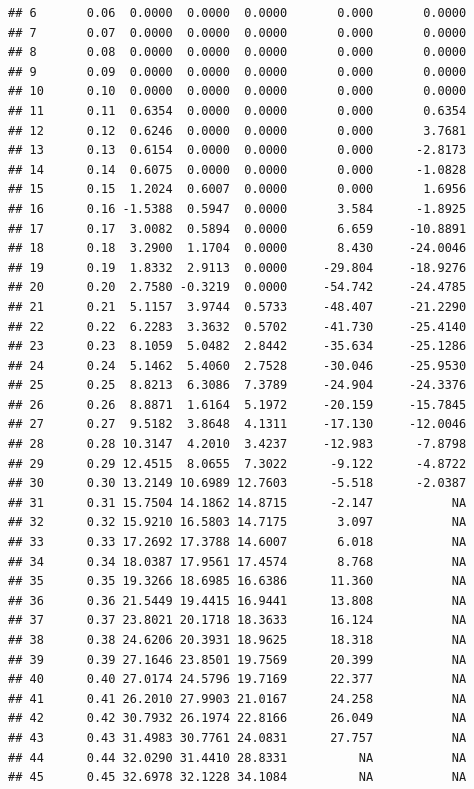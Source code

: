 \documentclass{article}\usepackage[]{graphicx}\usepackage[]{color}
\makeatletter
\newenvironment{kframe}{%
 \def\at@end@of@kframe{}%
 \ifinner\ifhmode%
  \def\at@end@of@kframe{\end{minipage}}%
  \begin{minipage}{\columnwidth}%
 \fi\fi%
 \def\FrameCommand##1{\hskip\@totalleftmargin \hskip-\fboxsep
 \colorbox{shadecolor}{##1}\hskip-\fboxsep
     \hskip-\linewidth \hskip-\@totalleftmargin \hskip\columnwidth}%
 \MakeFramed {\advance\hsize-\width
   \@totalleftmargin\z@ \linewidth\hsize
   \@setminipage}}%
 {\par\unskip\endMakeFramed%
 \at@end@of@kframe}
\newenvironment{knitrout}{}{} %
\makeatother
\begin{document}
\begin{knitrout}
\begin{kframe}
\begin{verbatim}
## 6       0.06  0.0000  0.0000  0.0000       0.000       0.0000
## 7       0.07  0.0000  0.0000  0.0000       0.000       0.0000
## 8       0.08  0.0000  0.0000  0.0000       0.000       0.0000
## 9       0.09  0.0000  0.0000  0.0000       0.000       0.0000
## 10      0.10  0.0000  0.0000  0.0000       0.000       0.0000
## 11      0.11  0.6354  0.0000  0.0000       0.000       0.6354
## 12      0.12  0.6246  0.0000  0.0000       0.000       3.7681
## 13      0.13  0.6154  0.0000  0.0000       0.000      -2.8173
## 14      0.14  0.6075  0.0000  0.0000       0.000      -1.0828
## 15      0.15  1.2024  0.6007  0.0000       0.000       1.6956
## 16      0.16 -1.5388  0.5947  0.0000       3.584      -1.8925
## 17      0.17  3.0082  0.5894  0.0000       6.659     -10.8891
## 18      0.18  3.2900  1.1704  0.0000       8.430     -24.0046
## 19      0.19  1.8332  2.9113  0.0000     -29.804     -18.9276
## 20      0.20  2.7580 -0.3219  0.0000     -54.742     -24.4785
## 21      0.21  5.1157  3.9744  0.5733     -48.407     -21.2290
## 22      0.22  6.2283  3.3632  0.5702     -41.730     -25.4140
## 23      0.23  8.1059  5.0482  2.8442     -35.634     -25.1286
## 24      0.24  5.1462  5.4060  2.7528     -30.046     -25.9530
## 25      0.25  8.8213  6.3086  7.3789     -24.904     -24.3376
## 26      0.26  8.8871  1.6164  5.1972     -20.159     -15.7845
## 27      0.27  9.5182  3.8648  4.1311     -17.130     -12.0046
## 28      0.28 10.3147  4.2010  3.4237     -12.983      -7.8798
## 29      0.29 12.4515  8.0655  7.3022      -9.122      -4.8722
## 30      0.30 13.2149 10.6989 12.7603      -5.518      -2.0387
## 31      0.31 15.7504 14.1862 14.8715      -2.147           NA
## 32      0.32 15.9210 16.5803 14.7175       3.097           NA
## 33      0.33 17.2692 17.3788 14.6007       6.018           NA
## 34      0.34 18.0387 17.9561 17.4574       8.768           NA
## 35      0.35 19.3266 18.6985 16.6386      11.360           NA
## 36      0.36 21.5449 19.4415 16.9441      13.808           NA
## 37      0.37 23.8021 20.1718 18.3633      16.124           NA
## 38      0.38 24.6206 20.3931 18.9625      18.318           NA
## 39      0.39 27.1646 23.8501 19.7569      20.399           NA
## 40      0.40 27.0174 24.5796 19.7169      22.377           NA
## 41      0.41 26.2010 27.9903 21.0167      24.258           NA
## 42      0.42 30.7932 26.1974 22.8166      26.049           NA
## 43      0.43 31.4983 30.7761 24.0831      27.757           NA
## 44      0.44 32.0290 31.4410 28.8331          NA           NA
## 45      0.45 32.6978 32.1228 34.1084          NA           NA

\end{verbatim}
\end{kframe}
\end{knitrout}
\end{document}
